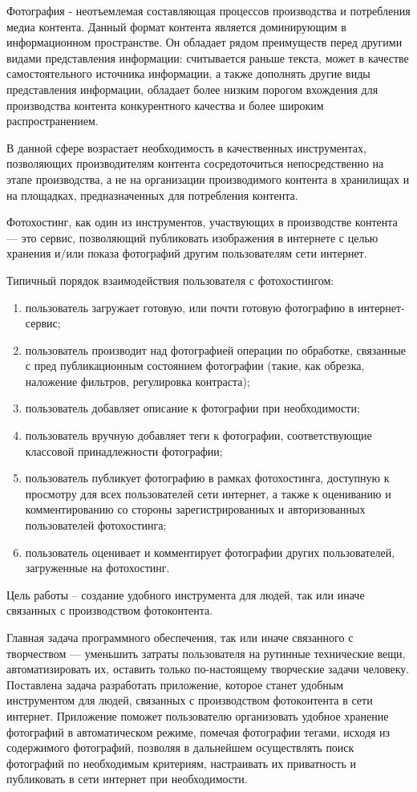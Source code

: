 
Фотография - неотъемлемая составляющая процессов производства и потребления медиа контента.
Данный формат контента является доминирующим в информационном пространстве. Он обладает рядом преимуществ перед другими видами представления информации: считывается раньше текста, может в качестве самостоятельного источника информации, а также дополнять другие виды представления информации, обладает более низким порогом вхождения для производства контента конкурентного качества и более широким распространением.

В данной сфере возрастает необходимость в качественных инструментах, позволяющих производителям контента сосредоточиться непосредственно на этапе производства, а не на организации производимого контента в хранилищах и на площадках, предназначенных для потребления контента.

Фотохостинг, как один из инструментов, участвующих в производстве контента — это сервис, позволяющий публиковать изображения в интернете с целью хранения и/или показа фотографий другим пользователям сети интернет.

Типичный порядок взаимодействия пользователя с фотохостингом:
\begin{enumerate}
    \item пользователь загружает готовую, или почти готовую фотографию в интернет-сервис;
    \item пользователь производит над фотографией операции по обработке, связанные с пред публикационным состоянием фотографии (такие, как обрезка, наложение фильтров, регулировка контраста);
    \item пользователь добавляет описание к фотографии при необходимости;
    \item пользователь вручную добавляет теги к фотографии, соответствующие классовой принадлежности фотографии;
    \item пользователь публикует фотографию в рамках фотохостинга, доступную к просмотру для всех пользователей сети интернет, а также к оцениванию и комментированию со стороны зарегистрированных и авторизованных пользователей фотохостинга;
    \item пользователь оценивает и комментирует фотографии других пользователей, загруженные на фотохостинг.
\end{enumerate}

Цель работы – создание удобного инструмента для людей, так или иначе связанных с производством фотоконтента.

Главная задача программного обеспечения, так или иначе связанного с творчеством — уменьшить затраты пользователя на рутинные технические вещи, автоматизировать их, оставить только по-настоящему творческие задачи человеку.
Поставлена задача разработать приложение, которое станет удобным инструментом для людей, связанных с производством фотоконтента в сети интернет. 
Приложение поможет пользователю организовать удобное хранение фотографий в автоматическом режиме, помечая фотографии тегами, исходя из содержимого фотографий, позволяя в дальнейшем осуществлять поиск фотографий по необходимым критериям, настраивать их приватность и публиковать в сети интернет при необходимости. 

\clearpage